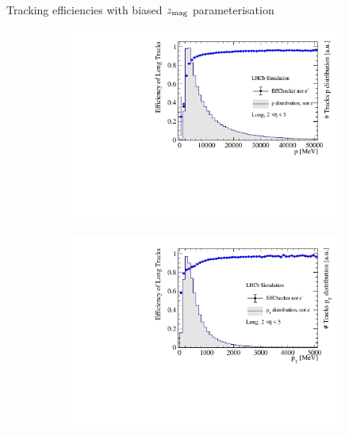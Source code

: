 \documentclass[xcolor={dvipsnames}]{beamer}
\begin{document}
\begin{frame}{Tracking efficiencies with biased $z_{\rm mag}$ parameterisation}
  \vspace{0.0cm}
  \begin{figure}[htb]
    \centering
    \begin{subfigure}{0.45\textwidth}
      \includegraphics[width=1\textwidth]{Plots/TrackEfficiency_p_improved_MC_parameterisation.pdf}
    \end{subfigure}%
    \begin{subfigure}{0.45\textwidth}
      \includegraphics[width=1\textwidth]{Plots/TrackEfficiency_pt_improved_MC_parameterisation.pdf}
    \end{subfigure}
    \begin{subfigure}{0.45\textwidth}

\end{subfigure}
\end{figure}
\end{frame}
\end{document}
